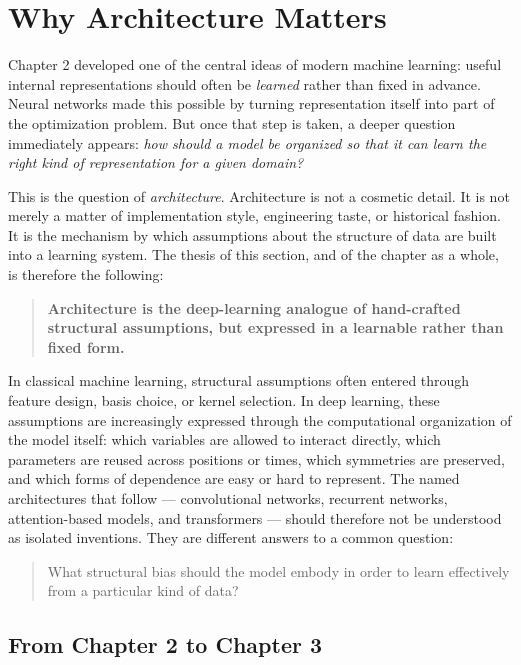 \section{Why Architecture Matters}

Chapter 2 developed one of the central ideas of modern machine learning:
useful internal representations should often be \emph{learned} rather than fixed in advance.
Neural networks made this possible by turning representation itself into part of the optimization problem.
But once that step is taken, a deeper question immediately appears:
\emph{how should a model be organized so that it can learn the right kind of representation for a given domain?}

\medskip

This is the question of \emph{architecture}.
Architecture is not a cosmetic detail.
It is not merely a matter of implementation style, engineering taste, or historical fashion.
It is the mechanism by which assumptions about the structure of data are built into a learning system.
The thesis of this section, and of the chapter as a whole, is therefore the following:

\begin{quote}
\textbf{Architecture is the deep-learning analogue of hand-crafted structural assumptions, but expressed in a learnable rather than fixed form.}
\end{quote}

\medskip

In classical machine learning, structural assumptions often entered through feature design, basis choice, or kernel selection.
In deep learning, these assumptions are increasingly expressed through the computational organization of the model itself:
which variables are allowed to interact directly, which parameters are reused across positions or times, which symmetries are preserved, and which forms of dependence are easy or hard to represent.
The named architectures that follow --- convolutional networks, recurrent networks, attention-based models, and transformers --- should therefore not be understood as isolated inventions.
They are different answers to a common question:

\begin{quote}
What structural bias should the model embody in order to learn effectively from a particular kind of data?
\end{quote}

\subsection*{From Chapter 2 to Chapter 3}

